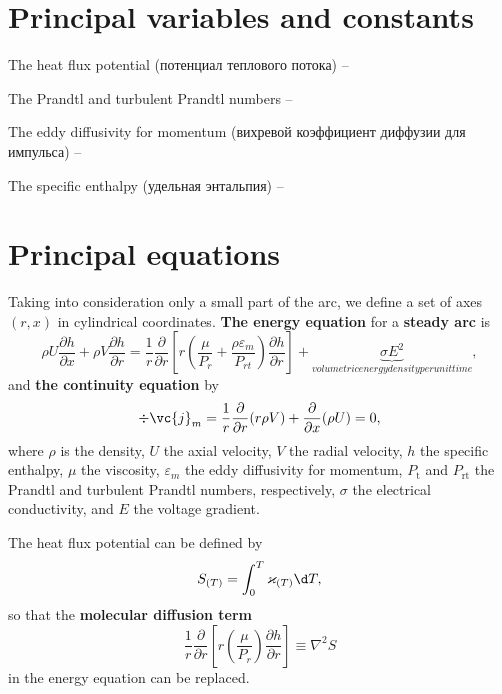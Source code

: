 \section{Principal variables and constants}


The heat flux potential (потенциал теплового потока) -- 

The Prandtl and turbulent Prandtl numbers -- 

The eddy diffusivity for momentum (вихревой коэффициент диффузии для импульса) -- 

The specific enthalpy (удельная энтальпия) --



\section{Principal equations}

Taking into consideration only a small part of the arc, we
define a set of axes $(r,x)$ in cylindrical coordinates.
\textbf{The energy equation} for a \textbf{steady arc} is
\begin{equation}
    \rho U \frac{\partial h}{\partial x} + \rho V \frac{\partial h}{\partial r} 
    =
    \frac{1}{r} \frac{\partial }{\partial r} 
    \left[
        r \left(\frac{\mu}{P_r} + \frac{\rho \varepsilon_m}{P_{rt}} \right) 
        \frac{\partial h}{\partial r} 
    \right] + 
    \underbrace{\sigma E^2}_{
    volumetric energy density per unit time
    },
\end{equation}
and \textbf{the continuity equation} by
\begin{equation} %
    \div \vc{j}_m = \frac{1}{r} \frac{\partial }{\partial r} (r \rho V) + \frac{\partial }{\partial x} (\rho U) = 0,
\end{equation}
where $\rho$ is the density, $U$ the axial velocity, $V$ the radial velocity, $h$ the specific enthalpy, $\mu$ the viscosity, $\varepsilon_m$ the eddy diffusivity for momentum, $P_\text{t}$ and $P_\text{rt}$ the Prandtl and turbulent Prandtl numbers, respectively, $\sigma$ the electrical conductivity, and $E$ the voltage gradient.

The heat flux potential can be defined by
\begin{equation*}
    S_{(T)} = \int_0^T \varkappa_{(T)} \d T,
\end{equation*}
so that the \textbf{molecular diffusion term}
\begin{equation*}
    \frac{1}{r} \frac{\partial }{\partial r} \left[
        r \left(\frac{\mu}{P_r} \right) \frac{\partial h}{\partial r} 
    \right] \equiv \nabla^2 S
\end{equation*}
in the energy equation can be replaced.


